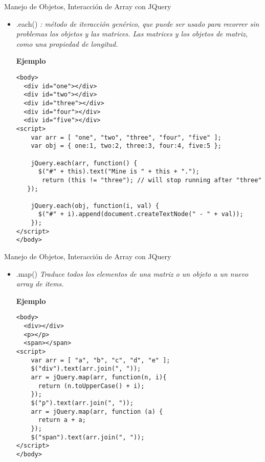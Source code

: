 \begin{frame}[fragile]{Manejo de Objetos, Interacción de Array con JQuery} %
\begin{itemize}
\item .each() \textit{ : método de iteracción genérico, que puede ser usado para recorrer sin problemas los objetos y las matrices. Las matrices y los objetos de matriz, como una propiedad de longitud.}

\textbf{Ejemplo}

\begin{lstlisting}
<body>
  <div id="one"></div>
  <div id="two"></div>
  <div id="three"></div>
  <div id="four"></div>
  <div id="five"></div>
<script>
    var arr = [ "one", "two", "three", "four", "five" ];
    var obj = { one:1, two:2, three:3, four:4, five:5 };

    jQuery.each(arr, function() {
      $("#" + this).text("Mine is " + this + ".");
       return (this != "three"); // will stop running after "three"
   });

    jQuery.each(obj, function(i, val) {
      $("#" + i).append(document.createTextNode(" - " + val));
    });
</script>
</body>
\end{lstlisting}
\end{itemize}
\end{frame}

\begin{frame}[fragile]{Manejo de Objetos, Interacción de Array con JQuery} %
\begin{itemize}
\item .map() \textit{Traduce todos los elementos de una matriz o un objeto a
un nuevo array de items.}

\textbf{Ejemplo}

\begin{lstlisting}
<body>
  <div></div>
  <p></p>
  <span></span>
<script>
    var arr = [ "a", "b", "c", "d", "e" ];
    $("div").text(arr.join(", "));
    arr = jQuery.map(arr, function(n, i){
      return (n.toUpperCase() + i);
    });
    $("p").text(arr.join(", "));
    arr = jQuery.map(arr, function (a) { 
      return a + a; 
    });
    $("span").text(arr.join(", "));
</script>
</body>
\end{lstlisting}
\end{itemize}
\end{frame}

